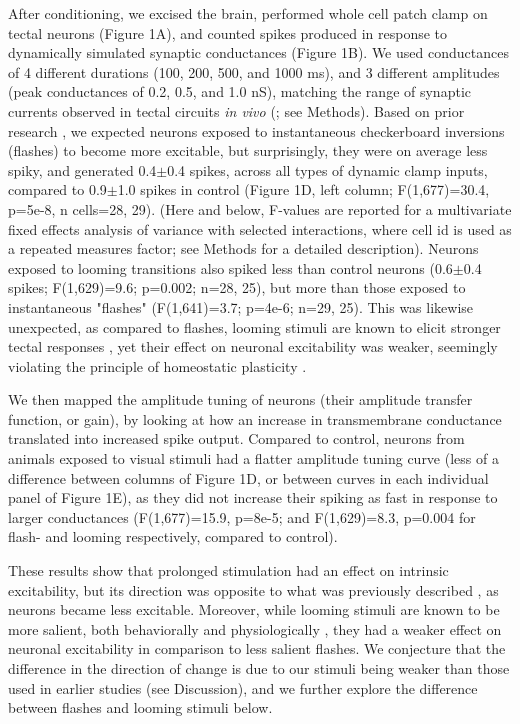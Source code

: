 \documentclass{article}
\begin{document}
After conditioning, we excised the brain, performed whole cell patch clamp on tectal neurons (Figure 1A), and counted spikes produced in response to dynamically simulated synaptic conductances (Figure 1B). We used conductances of 4 different durations (100, 200, 500, and 1000 ms), and 3 different amplitudes (peak conductances of 0.2, 0.5, and 1.0 nS), matching the range of synaptic currents observed in tectal circuits \textit{in vivo} (\citealt{xu2011,khakhalin2014,ciarleglio2015}; see Methods). Based on prior research \citep{aizenman2003,ciarleglio2015}, we expected neurons exposed to instantaneous checkerboard inversions (flashes) to become more excitable, but surprisingly, they were on average less spiky, and generated 0.4$\pm$0.4 spikes, across all types of dynamic clamp inputs, compared to 0.9$\pm$1.0 spikes in control (Figure 1D, left column; F(1,677)=30.4, p=5e-8, n cells=28, 29). (Here and below, F-values are reported for a multivariate fixed effects analysis of variance with selected interactions, where cell id is used as a repeated measures factor; see Methods for a detailed description). Neurons exposed to looming transitions also spiked less than control neurons (0.6$\pm$0.4 spikes; F(1,629)=9.6; p=0.002; n=28, 25), but more than those exposed to instantaneous "flashes" (F(1,641)=3.7; p=4e-6; n=29, 25). This was likewise unexpected, as compared to flashes, looming stimuli are known to elicit stronger tectal responses \citep{khakhalin2014,khakhalin2019graph}, yet their effect on neuronal excitability was weaker, seemingly violating the principle of homeostatic plasticity \citep{pratt2007,turrigiano2007}.

We then mapped the amplitude tuning of neurons (their amplitude transfer function, or gain), by looking at how an increase in transmembrane conductance translated into increased spike output. Compared to control, neurons from animals exposed to visual stimuli had a flatter amplitude tuning curve (less of a difference between columns of Figure 1D, or between curves in each individual panel of Figure 1E), as they did not increase their spiking as fast in response to larger conductances (F(1,677)=15.9, p=8e-5; and F(1,629)=8.3, p=0.004 for flash- and looming respectively, compared to control). %

These results show that prolonged stimulation had an effect on intrinsic excitability, but its direction was opposite to what was previously described \citep{aizenman2003,ciarleglio2015}, as neurons became less excitable. Moreover, while looming stimuli are known to be more salient, both behaviorally and physiologically \citep{khakhalin2014}, they had a weaker effect on neuronal excitability in comparison to less salient flashes. We conjecture that the difference in the direction of change is due to our stimuli being weaker than those used in earlier studies (see Discussion), and we further explore the difference between flashes and looming stimuli below.
\end{document}

